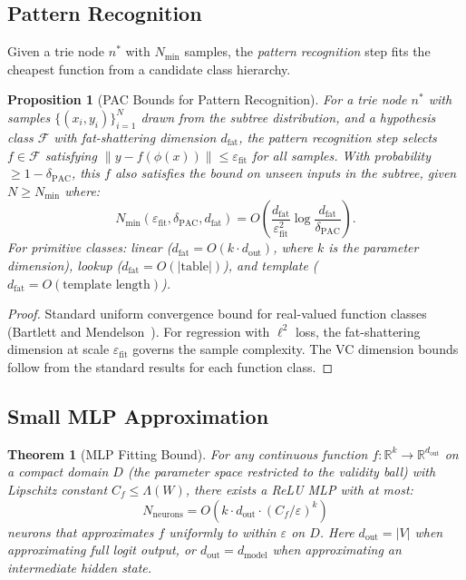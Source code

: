 \documentclass[11pt]{article}
\newtheorem{theorem}{Theorem}
\newtheorem{proposition}{Proposition}
\begin{document}
\subsection{Pattern Recognition}

Given a trie node $n^*$ with $N_{\min}$ samples, the \emph{pattern recognition}
step fits the cheapest function from a candidate class hierarchy.

\begin{proposition}[PAC Bounds for Pattern Recognition]
\label{prop:pac}
For a trie node $n^*$ with samples $\{(x_i, y_i)\}_{i=1}^N$ drawn from the
subtree distribution, and a hypothesis class $\mathcal{F}$ with fat-shattering dimension
$d_{\mathrm{fat}}$, the pattern recognition step selects $f \in \mathcal{F}$
satisfying $\|y - f(\phi(x))\| \leq \varepsilon_{\mathrm{fit}}$ for all samples.
With probability $\geq 1 - \delta_{\mathrm{PAC}}$, this $f$ also satisfies
the bound on \emph{unseen} inputs in the subtree, given $N \geq N_{\min}$
where:
\[
  N_{\min}(\varepsilon_{\mathrm{fit}}, \delta_{\mathrm{PAC}}, d_{\mathrm{fat}}) =
  O\!\left(\frac{d_{\mathrm{fat}}}{\varepsilon_{\mathrm{fit}}^2}
  \log\frac{d_{\mathrm{fat}}}{\delta_{\mathrm{PAC}}}\right).
\]
For primitive classes: linear ($d_{\mathrm{fat}} = O(k \cdot d_{\mathrm{out}})$, where $k$ is the parameter dimension), lookup
($d_{\mathrm{fat}} = O(|\mathrm{table}|)$), and template
($d_{\mathrm{fat}} = O(\text{template length})$).
\end{proposition}

\begin{proof}
Standard uniform convergence bound for real-valued function classes (Bartlett and Mendelson~\cite{blumer1989}). For regression with $\ell^2$ loss, the fat-shattering dimension at scale $\varepsilon_{\mathrm{fit}}$ governs the sample complexity.
The VC dimension bounds follow from the standard results for each function class.
\end{proof}

\subsection{Small MLP Approximation}

\begin{theorem}[MLP Fitting Bound]
\label{thm:mlp}
For any continuous function $f: \mathbb{R}^k \to \mathbb{R}^{d_{\mathrm{out}}}$
on a compact domain $D$ (the parameter space restricted to the validity ball)
with Lipschitz constant $C_f \leq \Lambda(W)$, there exists a ReLU MLP with at most:
\[
  N_{\mathrm{neurons}} = O\!\left(k \cdot d_{\mathrm{out}} \cdot (C_f/\varepsilon)^k\right)
\]
neurons that approximates $f$ uniformly to within $\varepsilon$ on $D$.
Here $d_{\mathrm{out}} = |V|$ when approximating full logit output, or
$d_{\mathrm{out}} = d_{\mathrm{model}}$ when approximating an intermediate
hidden state.
\end{theorem}
\end{document}
